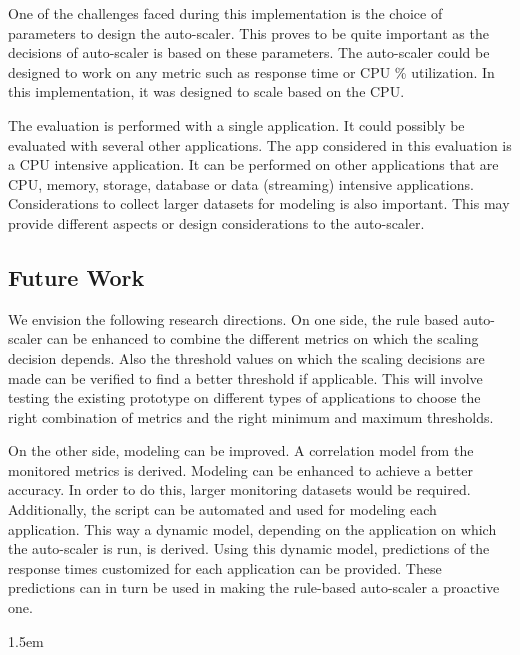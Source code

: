 \documentclass[article,type=msc,colorback,12pt,accentcolor=tud8b,table]{tudthesis}
\begin{document}
 One of the challenges faced during this implementation is the choice of parameters to design the auto-scaler. This proves to be quite important as the decisions of auto-scaler is based on these parameters. The auto-scaler could be designed to work on any metric such as response time or CPU \% utilization. In this implementation, it was designed to scale based on the CPU. 
 
 The evaluation is performed with a single application. It could possibly be evaluated with several other applications. The app considered in this evaluation is a CPU intensive application. It can be performed on other applications that are CPU, memory, storage, database or data (streaming) intensive applications. Considerations to collect larger datasets for modeling is also important. This may provide different aspects or design considerations to the auto-scaler.
 
 
\subsection{Future Work}

We envision the following research directions. On one side, the rule based auto-scaler can be enhanced to combine the different metrics on which the scaling decision depends. Also the threshold values on which the scaling decisions are made can be verified to find a better threshold if applicable. This will involve testing the existing prototype on different types of applications to choose the right combination of metrics and the right minimum and maximum thresholds. 

On the other side, modeling can be improved. A correlation model from the monitored metrics is derived. Modeling can be enhanced to achieve a better accuracy. In order to do this, larger monitoring datasets would be required. Additionally, the script can be automated and used for modeling each application. This way a dynamic model, depending on the application on which the auto-scaler is run, is derived. Using this dynamic model, predictions of the response times customized for each application can be provided. These predictions can in turn be used in making the rule-based auto-scaler a proactive one. 

\clearpage
 \hfill  

\emergencystretch 1.5em

	  

\clearpage

\printglossary
\clearpage
\end{document}
